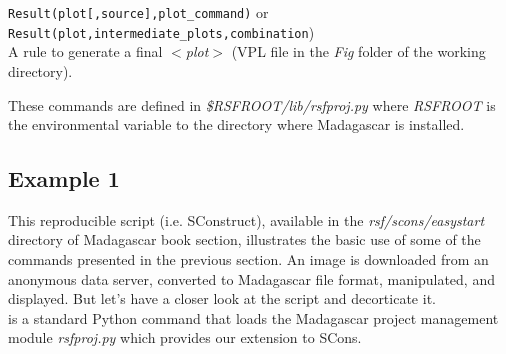 \noindent\texttt{Result(plot[,source],plot\_command)} or\\ 
\texttt{Result(plot,intermediate\_plots,combination})\\
\indent A rule to generate a final \textit{$<$plot$>$} (VPL file in
the \textit{Fig} folder of the working directory).

These commands are defined in \textit{\$RSFROOT/lib/rsfproj.py} where
\textit{RSFROOT} is the environmental variable to the directory where
Madagascar is installed.

\subsection{Example 1}
%


This reproducible script (i.e. SConstruct), available in the
\textit{rsf/scons/easystart} directory of Madagascar book section,
illustrates the basic use of some of the commands presented in the
previous section. An image is downloaded from an anonymous data
server, converted to Madagascar file format, manipulated, and
displayed. But let's have a closer look at the script
and decorticate it.\\


%
is a standard Python command that loads the Madagascar project
management module \textit{rsfproj.py} which provides our extension to
SCons.\\

